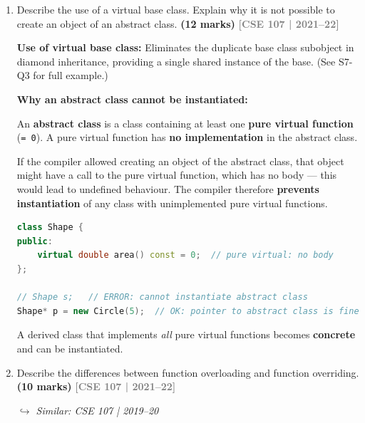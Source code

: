 \documentclass[12pt,a3paper]{article}
\newcommand{\yr}[1]{\hfill\textcolor{gray}{\small\textbf{[#1]}}}
\newcommand{\mk}[1]{\textcolor{orange!70!black}{\small\textbf{(#1 marks)}}}
\newcommand{\variant}[1]{\par\vspace{1pt}\textcolor{blue!50!black}%
  {\footnotesize\textit{$\hookrightarrow$ Similar: #1}}}
\begin{document}
\begin{enumerate}
\begin{tcolorbox}
\textbf{Output:}
\begin{lstlisting}
Circle, area=28.2743
Rectangle, area=20
Triangle, area=24
\end{lstlisting}

\end{tcolorbox}


\item Describe the use of a virtual base class. Explain why it is not possible to create an object of an abstract class. \mk{12}
\yr{CSE 107 | 2021--22}

\begin{tcolorbox}[enhanced,breakable,ansbox,colback=cG!4,colframe=cG,
  boxrule=0.8pt,arc=5pt,
  title={\textbf{Answer --- Virtual base class use; why abstract class cannot be instantiated}},
  fonttitle=\bfseries\color{white},colbacktitle=cG]

\textbf{Use of virtual base class:}
Eliminates the duplicate base class subobject in diamond inheritance,
providing a single shared instance of the base.  (See S7-Q3 for full
example.)

\textbf{Why an abstract class cannot be instantiated:}

An \textbf{abstract class} is a class containing at least one
\textbf{pure virtual function} (\texttt{= 0}).  A pure virtual
function has \textbf{no implementation} in the abstract class.

If the compiler allowed creating an object of the abstract class,
that object might have a call to the pure virtual function, which
has no body --- this would lead to undefined behaviour.  The compiler
therefore \textbf{prevents instantiation} of any class with
unimplemented pure virtual functions.

\begin{lstlisting}[language=C++]
class Shape {
public:
    virtual double area() const = 0;  // pure virtual: no body
};

// Shape s;   // ERROR: cannot instantiate abstract class
Shape* p = new Circle(5);  // OK: pointer to abstract class is fine
\end{lstlisting}

A derived class that implements \emph{all} pure virtual functions
becomes \textbf{concrete} and can be instantiated.

\end{tcolorbox}


\item Describe the differences between function overloading and function overriding. \mk{10}
\yr{CSE 107 | 2021--22}
\variant{CSE 107 | 2019--20}
\begin{tcolorbox}[enhanced,breakable,ansbox,colback=cG!4,colframe=cG,
  boxrule=0.8pt,arc=5pt,
  title={\textbf{Answer --- Function overloading vs function overriding}},
  fonttitle=\bfseries\color{white},colbacktitle=cG]


\end{tcolorbox}
\end{enumerate}
\end{document}
